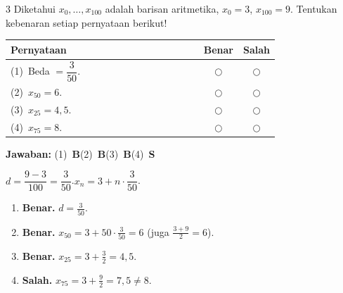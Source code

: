 \documentclass[11pt]{article}
\newcommand{\jawaban}[1]{%
  \noindent\colorbox{gold!30}{\parbox{\dimexpr\linewidth-2\fboxsep\relax}{%
    \textbf{Jawaban:} #1}}\par\smallskip}
\begin{document}
\begin{soal}{3}
Diketahui $x_0,\ldots,x_{100}$ adalah barisan aritmetika, $x_0=3$, $x_{100}=9$.
Tentukan kebenaran setiap pernyataan berikut!

\par\smallskip
{\renewcommand{\arraystretch}{1.4}%
\begin{tabular}{@{}p{0.76\linewidth}cc@{}}
\hline\textbf{Pernyataan}&\textbf{Benar}&\textbf{Salah}\\\hline
(1)~Beda $= \dfrac{3}{50}$.&$\bigcirc$&$\bigcirc$\\
(2)~$x_{50}=6$.&$\bigcirc$&$\bigcirc$\\
(3)~$x_{25}=4{,}5$.&$\bigcirc$&$\bigcirc$\\
(4)~$x_{75}=8$.&$\bigcirc$&$\bigcirc$\\\hline
\end{tabular}}
\end{soal}
\begin{pembox}
\jawaban{(1)~\textbf{B}\quad(2)~\textbf{B}\quad(3)~\textbf{B}\quad(4)~\textbf{S}}
$d=\dfrac{9-3}{100}=\dfrac{3}{50}$.\quad$x_n=3+n\cdot\dfrac{3}{50}$.
\begin{enumerate}[leftmargin=*,topsep=2pt,itemsep=2pt]
\item \textbf{Benar.} $d=\tfrac{3}{50}$.
\item \textbf{Benar.} $x_{50}=3+50\cdot\tfrac{3}{50}=6$ (juga $\tfrac{3+9}{2}=6$).
\item \textbf{Benar.} $x_{25}=3+\tfrac{3}{2}=4{,}5$.
\item \textbf{Salah.} $x_{75}=3+\tfrac{9}{2}=7{,}5\neq8$.
\end{enumerate}
\end{pembox}
\end{document}
